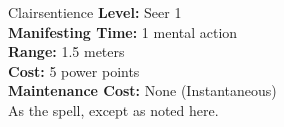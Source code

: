 {Clairsentience}
{
	\textbf{Level:}
	Seer 1\\
	\textbf{Manifesting Time:}
	1 mental action\\
	\textbf{Range:}
	1.5 meters\\
	\textbf{Cost:}
	5 power points\\
	\textbf{Maintenance Cost:}
	None (Instantaneous)\\
}
{
	As the  spell, except as noted here.
}